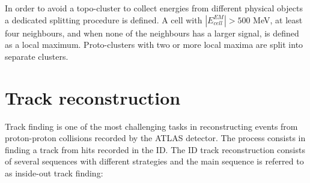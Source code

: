 \documentclass[a4paper, oneside, 11pt, openright]{book}
\begin{document}
			In order to avoid a topo-cluster to collect energies from different physical objects a dedicated splitting procedure is defined. A cell with $|E_{cell}^{EM}| > 500$ MeV, at least four neighbours, and when none of the neighbours has a larger signal, is defined as a local maximum. Proto-clusters with two or more local maxima are split into separate clusters.
			
		
		\section{Track reconstruction}\label{section:Track reco}
		Track finding is one of the most challenging tasks in reconstructing events from proton-proton  collisions  recorded  by  the  ATLAS  detector. The process consists in finding a track from hits recorded in the ID. The ID track reconstruction consists of several sequences with different strategies and the main sequence is referred to as inside-out track finding: \cite{ID reco alg}
\end{document}
